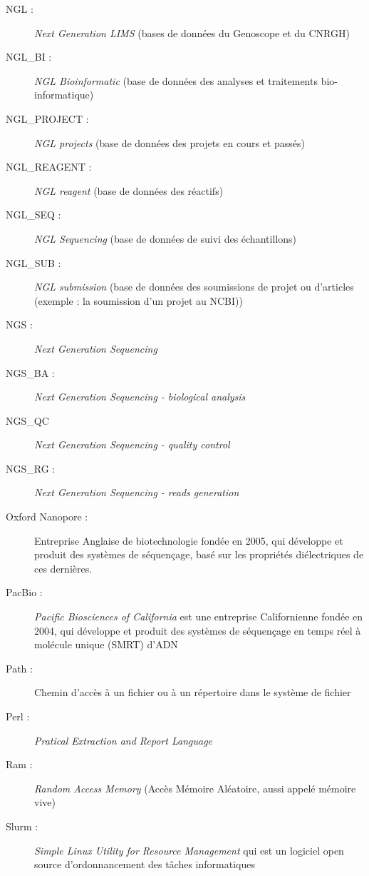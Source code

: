 \begin{description}
    \item[NGL :] \emph{Next Generation LIMS} (bases de données du Genoscope et du CNRGH)
    \item[NGL\_BI :] \emph{NGL Bioinformatic} (base de données des analyses et traitements bio-informatique)
    \item[NGL\_PROJECT :] \emph{NGL projects} (base de données des projets en cours et passés)
    \item[NGL\_REAGENT :] \emph{NGL reagent} (base de données des réactifs)
    \item[NGL\_SEQ :] \emph{NGL Sequencing} (base de données de suivi des échantillons)
    \item[NGL\_SUB :] \emph{NGL submission} (base de données des soumissions de projet ou d'articles (exemple : la soumission d'un projet au NCBI))
    \item[NGS :] \emph{Next Generation Sequencing}
    \item[NGS\_BA :] \emph{Next Generation Sequencing - biological analysis}
    \item[NGS\_QC] \emph{Next Generation Sequencing - quality control}
    \item[NGS\_RG : ] \emph{Next Generation Sequencing - reads generation}
    \item[Oxford Nanopore :] Entreprise Anglaise de biotechnologie fondée en 2005, qui développe et produit des systèmes de séquençage, basé sur les propriétés diélectriques de ces dernières.
    \item[PacBio :] \emph{Pacific Biosciences of California} est une entreprise Californienne fondée en 2004, qui développe et produit des systèmes de séquençage en temps réel à molécule unique (SMRT) d'ADN
    \item[Path : ] Chemin d'accès à un fichier ou à un répertoire dans le système de fichier
    \item[Perl :] \emph{Pratical Extraction and Report Language}
    \item[Ram :] \emph{Random Access Memory} (Accès Mémoire Aléatoire, aussi appelé mémoire vive)
    \item[Slurm :] \emph{Simple Linux Utility for Resource Management} qui est un logiciel open source d'ordonnancement des tâches informatiques
\end{description}